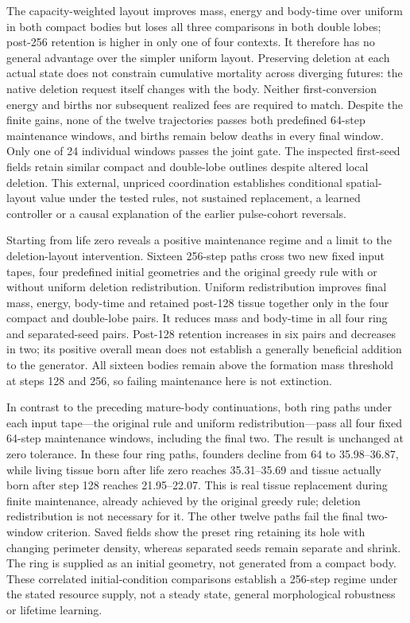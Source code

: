 The capacity-weighted layout improves mass, energy and body-time over uniform in both compact bodies but loses all three comparisons in both double lobes; post-256 retention is higher in only one of four contexts. It therefore has no general advantage over the simpler uniform layout. Preserving deletion at each actual state does not constrain cumulative mortality across diverging futures: the native deletion request itself changes with the body. Neither first-conversion energy and births nor subsequent realized fees are required to match. Despite the finite gains, none of the twelve trajectories passes both predefined 64-step maintenance windows, and births remain below deaths in every final window. Only one of 24 individual windows passes the joint gate. The inspected first-seed fields retain similar compact and double-lobe outlines despite altered local deletion. This external, unpriced coordination establishes conditional spatial-layout value under the tested rules, not sustained replacement, a learned controller or a causal explanation of the earlier pulse-cohort reversals.

Starting from life zero reveals a positive maintenance regime and a limit to the deletion-layout intervention. Sixteen 256-step paths cross two new fixed input tapes, four predefined initial geometries and the original greedy rule with or without uniform deletion redistribution. Uniform redistribution improves final mass, energy, body-time and retained post-128 tissue together only in the four compact and double-lobe pairs. It reduces mass and body-time in all four ring and separated-seed pairs. Post-128 retention increases in six pairs and decreases in two; its positive overall mean does not establish a generally beneficial addition to the generator. All sixteen bodies remain above the formation mass threshold at steps 128 and 256, so failing maintenance here is not extinction.

In contrast to the preceding mature-body continuations, both ring paths under each input tape---the original rule and uniform redistribution---pass all four fixed 64-step maintenance windows, including the final two. The result is unchanged at zero tolerance. In these four ring paths, founders decline from 64 to 35.98--36.87, while living tissue born after life zero reaches 35.31--35.69 and tissue actually born after step 128 reaches 21.95--22.07. This is real tissue replacement during finite maintenance, already achieved by the original greedy rule; deletion redistribution is not necessary for it. The other twelve paths fail the final two-window criterion. Saved fields show the preset ring retaining its hole with changing perimeter density, whereas separated seeds remain separate and shrink. The ring is supplied as an initial geometry, not generated from a compact body. These correlated initial-condition comparisons establish a 256-step regime under the stated resource supply, not a steady state, general morphological robustness or lifetime learning.

